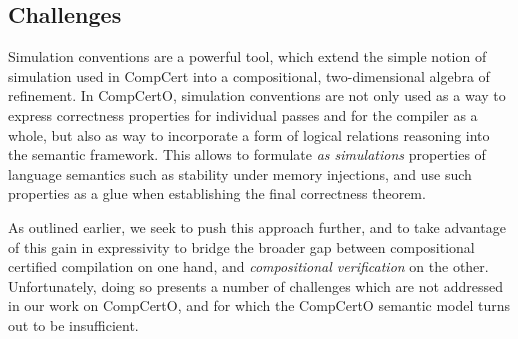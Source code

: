 %
%


\subsection{Challenges}

Simulation conventions are a powerful tool,
which extend the simple notion of simulation used in CompCert
into a compositional, two-dimensional algebra of refinement.
In CompCertO,
simulation conventions are
not only used as a way to express correctness properties for
individual passes and for the compiler as a whole,
but also as way to incorporate a form of logical relations reasoning
into the semantic framework.
This allows to formulate \emph{as simulations}
properties of language semantics such as
stability under memory injections,
and use such properties as a glue
when establishing the final correctness theorem.

As outlined earlier,
we seek to push this approach further,
and to take advantage of this gain in expressivity
to bridge the broader gap between
compositional certified compilation on one hand, and
\emph{compositional verification} on the other.
Unfortunately,
doing so presents a number of challenges
which are not addressed in our work on CompCertO,
and for which the CompCertO semantic model
turns out to be insufficient.

